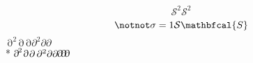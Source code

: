 \documentclass[10pt, twoside]{lecturenotes}
\newcommand{\partialup}{\raisebox{.25pt}{\rotatebox[origin=c]{10}{$\!\partial\!$}}}
\begin{document}
\[
\mathord{\mbox{$\mathscr{S}$}}^2\mathscr{S}^2
\]
\[
\mathbf{\notnot\sigma} = 1 \mathcal{S} \mathbfcal{S}
\]
$\mathop{{}\partial}^2\mathop{{}\partial}\mathop{{}\partial}\partial^2\partial\partial$\\*
$\mathop{{}\partialup}^2\mathop{{}\partialup}\mathop{{}\partial}\partial^2\partial\partial\partialup\partialup\partialup$
\end{document}
